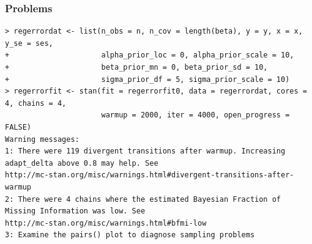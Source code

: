 \documentclass[xcolor=dvipsnames]{beamer}
\begin{document}
\begin{frame}[fragile]
\frametitle{Problems}
{\tiny
\begin{verbatim}
> regerrordat <- list(n_obs = n, n_cov = length(beta), y = y, x = x, y_se = ses,
+                     alpha_prior_loc = 0, alpha_prior_scale = 10,
+                     beta_prior_mn = 0, beta_prior_sd = 10,
+                     sigma_prior_df = 5, sigma_prior_scale = 10)
> regerrorfit <- stan(fit = regerrorfit0, data = regerrordat, cores = 4, chains = 4,
                      warmup = 2000, iter = 4000, open_progress = FALSE)
Warning messages:
1: There were 119 divergent transitions after warmup. Increasing adapt_delta above 0.8 may help. See
http://mc-stan.org/misc/warnings.html#divergent-transitions-after-warmup
2: There were 4 chains where the estimated Bayesian Fraction of Missing Information was low. See
http://mc-stan.org/misc/warnings.html#bfmi-low
3: Examine the pairs() plot to diagnose sampling problems
\end{verbatim}}

\end{frame}

\end{document}
